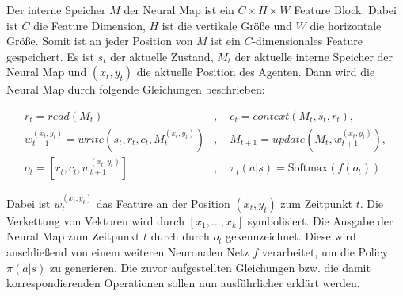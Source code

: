 Der interne Speicher $M$ der Neural Map ist ein $C \times H \times W$ Feature Block. Dabei ist $C$ die Feature Dimension, $H$ ist die vertikale Größe und $W$ die horizontale Größe. Somit ist an jeder Position von $M$ ist ein $C$-dimensionales Feature gespeichert. Es ist $s_t$ der aktuelle Zustand, $M_t$ der aktuelle interne Speicher der Neural Map und $(x_t,y_t)$ die aktuelle Position des Agenten. Dann wird die Neural Map durch folgende Gleichungen beschrieben:

\begin{equation*}
  \begin{align*}
    r_t=read(M_t)&, \quad c_t=context(M_t, s_t, r_t), \\
    w_{t+1}^{(x_t,y_t)}=write(s_t, r_t, c_t, M_t^{(x_t,y_t)})&, \quad M_{t+1}=update(M_t, w_{t+1}^{(x_t,y_t)}), \\
    o_t=[r_t, c_t, w_{t+1}^{(x_t,y_t)}]&, \quad \pi_t(a|s)=\text{Softmax}(f(o_t))
  \end{align*}
\end{equation*}

Dabei ist $w_t^{(x_t,y_t)}$ das Feature an der Position $(x_t,y_t)$ zum Zeitpunkt $t$. Die Verkettung von Vektoren wird durch $[x_1, \dots, x_k]$ symbolisiert. Die Ausgabe der Neural Map zum Zeitpunkt $t$ durch durch $o_t$ gekennzeichnet. Diese wird anschließend von einem weiteren Neuronalen Netz $f$ verarbeitet, um die Policy $\pi(a|s)$ zu generieren. Die zuvor aufgestellten Gleichungen bzw. die damit korrespondierenden Operationen sollen nun ausführlicher erklärt werden.

